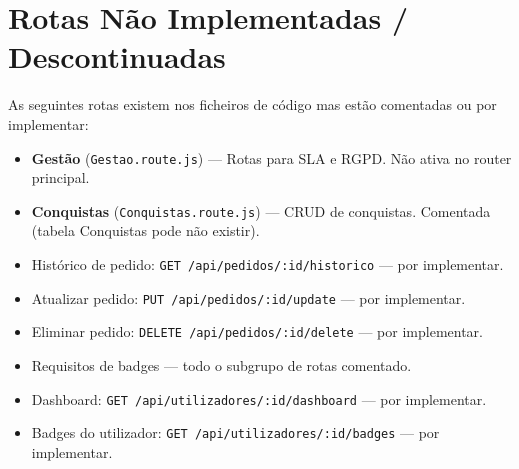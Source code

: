 \documentclass[12pt,a4paper]{article}
\begin{document}
\newpage

\section{Rotas Não Implementadas / Descontinuadas}

As seguintes rotas existem nos ficheiros de código mas estão comentadas ou por implementar:

\begin{itemize}
    \item \textbf{Gestão} (\texttt{Gestao.route.js}) --- Rotas para SLA e RGPD. Não ativa no router principal.
    \item \textbf{Conquistas} (\texttt{Conquistas.route.js}) --- CRUD de conquistas. Comentada (tabela Conquistas pode não existir).
    \item Histórico de pedido: \texttt{GET /api/pedidos/:id/historico} --- por implementar.
    \item Atualizar pedido: \texttt{PUT /api/pedidos/:id/update} --- por implementar.
    \item Eliminar pedido: \texttt{DELETE /api/pedidos/:id/delete} --- por implementar.
    \item Requisitos de badges --- todo o subgrupo de rotas comentado.
    \item Dashboard: \texttt{GET /api/utilizadores/:id/dashboard} --- por implementar.
    \item Badges do utilizador: \texttt{GET /api/utilizadores/:id/badges} --- por implementar.
\end{itemize}
\end{document}
